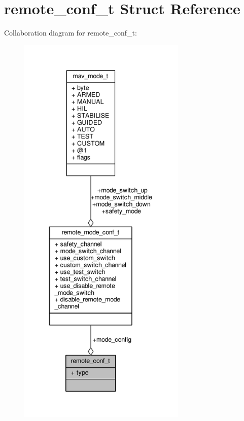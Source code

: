 \hypertarget{structremote__conf__t}{\section{remote\+\_\+conf\+\_\+t Struct Reference}
\label{structremote__conf__t}
}


Collaboration diagram for remote\+\_\+conf\+\_\+t\+:
\nopagebreak
\begin{figure}[H]
\begin{center}
\leavevmode
\includegraphics[height=550pt]{structremote__conf__t__coll__graph}
\end{center}
\end{figure}
